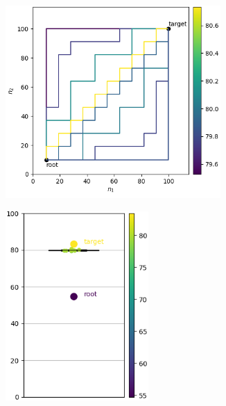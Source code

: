 \documentclass{article}
\begin{document}
\begin{figure}[htbp]
    \centering
    \begin{subfigure}[b]{0.29\textwidth}
        \centering
        \includegraphics[width=0.9\textwidth]{imgs/pathes_FNIST_random_2024_05_02_15_13_26.png}
    \end{subfigure}
    \begin{subfigure}[b]{0.29\textwidth}
        \centering
        \includegraphics[width=0.6\textwidth]{imgs/box_plot_FNIST_random_2024_05_02_15_13_27.png}
    \end{subfigure}
    

\end{figure}
\end{document}
